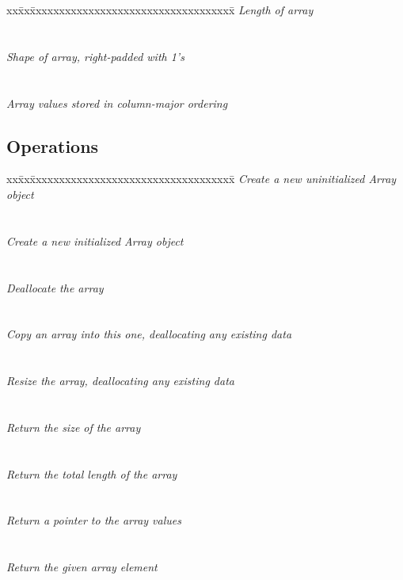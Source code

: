 \begin{tabbing}
xx\=xx\=xxxxxxxxxxxxxxxxxxxxxxxxxxxxxxxxxxx\= \kill
\> \todo \>  \textit{Length of array} \\
\>       \>       \\ \\
\> \todo \>  \textit {Shape of array, right-padded with 1's} \\
\>       \>   \\ \\
\> \todo \>  \textit {Array values stored in column-major ordering}\\
\>       \> 
\end{tabbing}

\subsection{Operations}

\begin{tabbing}
xx\=xx\=xxxxxxxxxxxxxxxxxxxxxxxxxxxxxxxxxxx\= \kill
\> \todo \> \textit{Create a new uninitialized Array object} \\
\>       \>  \\ \\
\> \todo \> \textit{Create a new initialized Array object} \\
\>       \>  \\ \\
\> \todo \> \textit{Deallocate the array} \\
\>       \>   \\ \\
\> \todo \> \textit{Copy an array into this one, deallocating any existing data} \\
\>       \>   \\ \\
\> \todo \> \textit{Resize the array, deallocating any existing data} \\
\>       \>    \\ \\
\> \todo \> \textit{Return the size of the array} \\
\>       \>   \\ \\
\> \todo \> \textit{Return the total length of the array} \\
\>       \>   \\ \\
\> \todo \> \textit{Return a pointer to the array values} \\
\>       \>   \\ \\
\> \todo \> \textit{Return the given array element} \\
\>       \> 
\end{tabbing}

